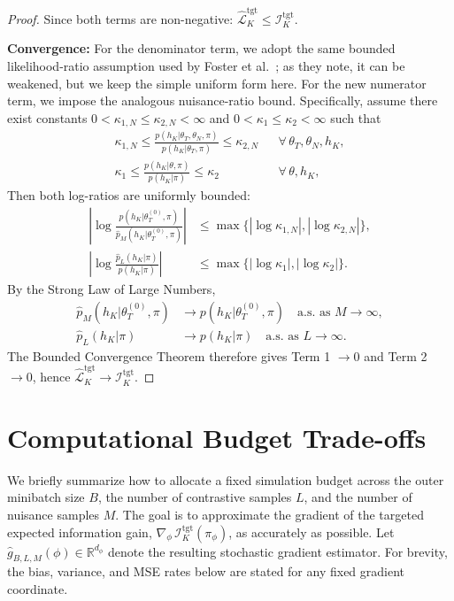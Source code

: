 \begin{proof}
Since both terms are non-negative: $\hat{\mathcal{L}}_K^{\text{tgt}} \leq \mathcal{I}_K^{\text{tgt}}$.

\textbf{Convergence:} For the denominator term, we adopt the same bounded likelihood-ratio assumption used by Foster et al.~\cite{foster2021}; as they note, it can be weakened, but we keep the simple uniform form here. For the new numerator term, we impose the analogous nuisance-ratio bound. Specifically, assume there exist constants $0<\kappa_{1,N} \le \kappa_{2,N}<\infty$ and $0<\kappa_1 \le \kappa_2<\infty$ such that
\begin{align}
\kappa_{1,N} \le \frac{p(h_K|\theta_T,\theta_N,\pi)}{p(h_K|\theta_T,\pi)} \le \kappa_{2,N} && \forall\,\theta_T,\theta_N,h_K, \\
\kappa_1 \le \frac{p(h_K|\theta,\pi)}{p(h_K|\pi)} \le \kappa_2 && \forall\,\theta,h_K,
\end{align}
Then both log-ratios are uniformly bounded:
\begin{align}
\left|\log \frac{p(h_K|\theta_T^{(0)},\pi)}{\widehat p_M(h_K|\theta_T^{(0)},\pi)}\right|
&\le \max\{ |\log \kappa_{1,N}|, |\log \kappa_{2,N}| \}, \\
\left|\log \frac{\widehat p_L(h_K|\pi)}{p(h_K|\pi)}\right|
&\le \max\{ |\log \kappa_1|, |\log \kappa_2| \}.
\end{align}
By the Strong Law of Large Numbers,
\begin{align}
\widehat p_M(h_K|\theta_T^{(0)},\pi) &\to p(h_K|\theta_T^{(0)},\pi) \quad \text{a.s. as } M\to\infty, \\
\widehat p_L(h_K|\pi) &\to p(h_K|\pi) \quad \text{a.s. as } L\to\infty.
\end{align}
The Bounded Convergence Theorem therefore gives Term 1 $\to 0$ and Term 2 $\to 0$, hence $\hat{\mathcal{L}}_K^{\text{tgt}} \to \mathcal{I}_K^{\text{tgt}}$.
\end{proof}

\section{Computational Budget Trade-offs}
\label{sec:budget_stub}

We briefly summarize how to allocate a fixed simulation budget across the outer minibatch size $B$, the number of contrastive samples $L$, and the number of nuisance samples $M$.
The goal is to approximate the gradient of the targeted expected information gain, $\nabla_\phi\,\mathcal{I}_K^{\text{tgt}}(\pi_\phi)$, as accurately as possible.
Let $\hat g_{B,L,M}(\phi) \in \mathbb{R}^{d_\phi}$ denote the resulting stochastic gradient estimator. For brevity, the bias, variance, and MSE rates below are stated for any fixed gradient coordinate.

